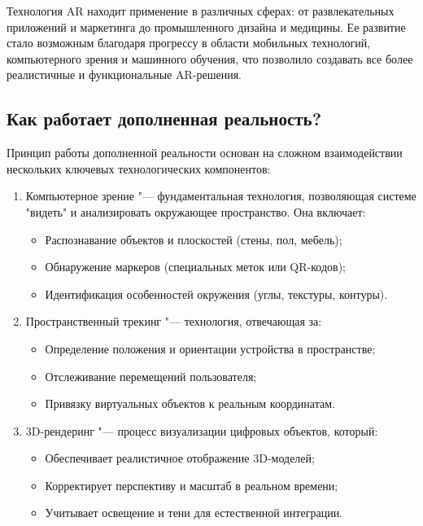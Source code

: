 Технология AR находит применение в различных сферах: от развлекательных приложений и маркетинга до промышленного дизайна и медицины. Ее развитие стало возможным благодаря прогрессу в области мобильных технологий, компьютерного зрения и машинного обучения, что позволило создавать все более реалистичные и функциональные AR-решения.

\subsection {Как работает дополненная реальность?}

Принцип работы дополненной реальности основан на сложном взаимодействии нескольких ключевых технологических компонентов:
\begin{enumerate}
	\item Компьютерное зрение "--- фундаментальная технология, позволяющая системе "видеть" и анализировать окружающее пространство. Она включает:
		\begin{itemize}
			\item Распознавание объектов и плоскостей (стены, пол, мебель);
			\item Обнаружение маркеров (специальных меток или QR-кодов);
			\item Идентификация особенностей окружения (углы, текстуры, контуры).
		\end{itemize}		
	\item Пространственный трекинг "--- технология, отвечающая за:
		\begin{itemize}
			\item Определение положения и ориентации устройства в пространстве;
			\item Отслеживание перемещений пользователя;
			\item Привязку виртуальных объектов к реальным координатам.
		\end{itemize}
	\item  3D-рендеринг "--- процесс визуализации цифровых объектов, который:
		\begin{itemize}
			\item Обеспечивает реалистичное отображение 3D-моделей;
			\item Корректирует перспективу и масштаб в реальном времени;
			\item Учитывает освещение и тени для естественной интеграции.
		\end{itemize}
\end{enumerate}

